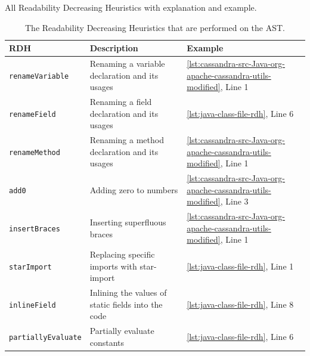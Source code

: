 \documentclass[%
class=scrreprt,
chapterprefix=false,%
open=right,%
twoside=false,%
paper=a4,%
logofile={Logo\_zentral\_farbig\_EN.png},%
thesistype=master,%
UKenglish,%
]{se2thesis}
\theoremstyle{definition}
\begin{document}
	\begin{table}[p]
		\centering
		\caption{All Readability Decreasing Heuristics with explanation and example.}
		\label{tab:all-rdhs}
		\begin{subtable}{\textwidth}
			\centering
			\caption{The Readability Decreasing Heuristics that are performed on the AST.}
			\vspace{8pt}
			\label{tab:ast-rdhs}
			\begin{tabular}{|p{}|p{}|p{}|}
				\hline
				\textbf{RDH} & \textbf{Description} & \textbf{Example} \\
				\hline
				\texttt{renameVariable} & Renaming a variable declaration and its usages & \autoref{lst:cassandra-src-Java-org-apache-cassandra-utils-modified}, Line 1 \\
				\hline
				\texttt{renameField} & Renaming a field declaration and its usages & \autoref{lst:java-class-file-rdh}, Line 6 \\
				\hline
				\texttt{renameMethod} & Renaming a method declaration and its usages & \autoref{lst:cassandra-src-Java-org-apache-cassandra-utils-modified}, Line 1 \\
				\hline
				\texttt{add0} & Adding zero to numbers & \autoref{lst:cassandra-src-Java-org-apache-cassandra-utils-modified}, Line 3 \\
				\hline
				\texttt{insertBraces} & Inserting superfluous braces & \autoref{lst:cassandra-src-Java-org-apache-cassandra-utils-modified}, Line 1 \\
				\hline
				\texttt{starImport} & Replacing specific imports with star-import & \autoref{lst:java-class-file-rdh}, Line 1 \\
				\hline
				\texttt{inlineField} & Inlining the values of static fields into the code & \autoref{lst:java-class-file-rdh}, Line 8 \\
				\hline
				\texttt{partiallyEvaluate} & Partially evaluate constants & \autoref{lst:java-class-file-rdh}, Line 6 \\
				\hline
			\end{tabular}
		\end{subtable}
		
		\vspace{8pt}
		

\end{table}
\end{document}
